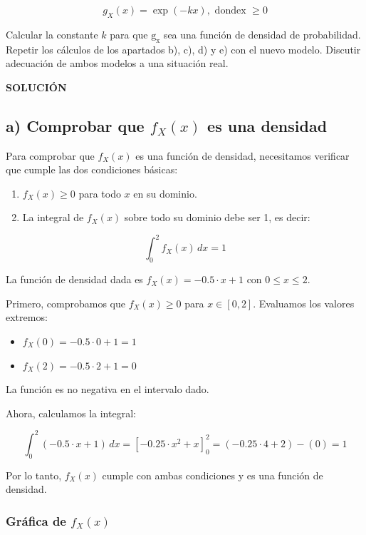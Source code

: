 \documentclass[
]{article}
\providecommand{\tightlist}{%
  \setlength{\itemsep}{0pt}\setlength{\parskip}{0pt}}
\begin{document}
\[
g_{X}(x)=\exp (-k x), \text { dondex } \geq 0
\]

Calcular la constante \(k\) para que \(\mathrm{g}_{\mathrm{x}}\) sea una función de densidad de probabilidad. Repetir los cálculos de los apartados b), c), d) y e) con el nuevo modelo. Discutir adecuación de ambos modelos a una situación real.

\textbf{SOLUCIÓN}

\subsection{\texorpdfstring{a) Comprobar que \(f_X(x)\) es una densidad}{a) Comprobar que f\_X(x) es una densidad}}\label{a-comprobar-que-f_xx-es-una-densidad}

Para comprobar que \(f_X(x)\) es una función de densidad, necesitamos verificar que cumple las dos condiciones básicas:

\begin{enumerate}
\def\labelenumi{\arabic{enumi}.}
\tightlist
\item
  \(f_X(x) \geq 0\) para todo \(x\) en su dominio.
\item
  La integral de \(f_X(x)\) sobre todo su dominio debe ser 1, es decir:
\end{enumerate}

\[
\int_0^2 f_X(x) \, dx = 1
\]

La función de densidad dada es \(f_X(x) = -0.5 \cdot x + 1\) con \(0 \leq x \leq 2\).

Primero, comprobamos que \(f_X(x) \geq 0\) para \(x \in [0, 2]\). Evaluamos los valores extremos:

\begin{itemize}
\tightlist
\item
  \(f_X(0) = -0.5 \cdot 0 + 1 = 1\)
\item
  \(f_X(2) = -0.5 \cdot 2 + 1 = 0\)
\end{itemize}

La función es no negativa en el intervalo dado.

Ahora, calculamos la integral:

\[
\int_0^2 (-0.5 \cdot x + 1) \, dx = \left[ -0.25 \cdot x^2 + x \right]_0^2 = (-0.25 \cdot 4 + 2) - (0) = 1
\]

Por lo tanto, \(f_X(x)\) cumple con ambas condiciones y es una función de densidad.

\subsubsection{\texorpdfstring{Gráfica de \(f_X(x)\)}{Gráfica de f\_X(x)}}\label{gruxe1fica-de-f_xx}
\end{document}
